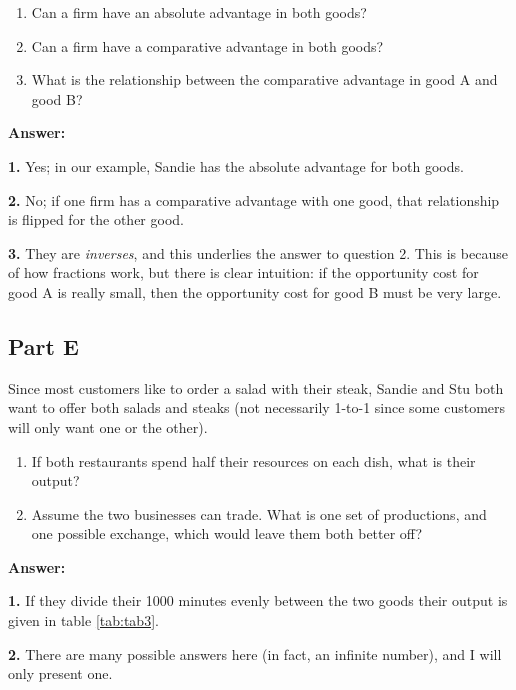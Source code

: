 \documentclass[12pt]{article}
\begin{document}
\begin{enumerate}
    \item Can a firm have an absolute advantage in both goods?
    \item Can a firm have a comparative advantage in both goods?
    \item What is the relationship between the comparative advantage in good A and good B?
\end{enumerate}

\textbf{Answer:}

\textbf{1.} Yes; in our example, Sandie has the absolute advantage for both goods.

\medskip

\textbf{2.} No; if one firm has a comparative advantage with one good, that relationship is flipped for the other good.

\medskip

\textbf{3.} They are \textit{inverses}, and this underlies the answer to question 2. This is because of how fractions work, but there is clear intuition: if the opportunity cost for good A is really small, then the opportunity cost for good B must be very large.

\subsection*{Part E}
Since most customers like to order a salad with their steak, Sandie and Stu both want to offer both salads and steaks (not necessarily 1-to-1 since some customers will only want one or the other).

\begin{enumerate}
    \item If both restaurants spend half their resources on each dish, what is their output?
    \item Assume the two businesses can trade. What is one set of productions, and one possible exchange, which would leave them both better off?
\end{enumerate}

\textbf{Answer:}

\textbf{1.} If they divide their 1000 minutes evenly between the two goods their output is given in table \ref{tab:tab3}.



\textbf{2.} There are many possible answers here (in fact, an infinite number), and I will only present one.

\medskip
\end{document}
